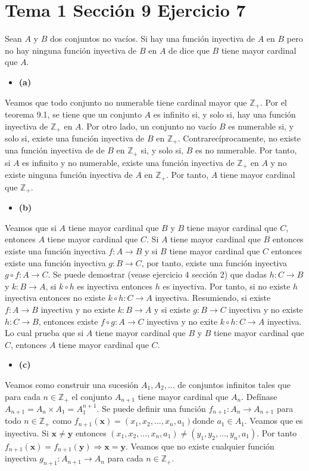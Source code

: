 \documentclass{article}
\newcommand{\vect}[1]{\boldsymbol{#1}}
\begin{document}
\section{Tema 1 Sección 9 Ejercicio 7}
Sean $A$ y $B$ dos conjuntos no vacíos. Si hay una función inyectiva de $A$ en $B$ pero no hay ninguna función inyectiva de $B$ en $A$ de dice que $B$ tiene mayor cardinal que $A$.
\begin{itemize}
\item \bf (a) \rm
\end{itemize}
Veamos que todo conjunto no numerable tiene cardinal mayor que $\mathbb{Z}_{+}$. Por el teorema 9.1, se tiene que un conjunto $A$ es infinito si, y solo si, hay una función inyectiva de $\mathbb{Z}_{+}$ en $A$. Por otro lado, un conjunto no vacío $B$ es numerable si, y solo si, existe una función inyectiva de $B$ en $\mathbb{Z}_{+}$. Contrarecíprocamente, no existe una función inyectiva de de $B$ en $\mathbb{Z}_{+}$ si, y solo si, $B$ es no numerable. Por tanto, si $A$ es infinito y no numerable, existe una función inyectiva de $\mathbb{Z}_{+}$ en $A$ y no existe ninguna función inyectiva de $A$ en $\mathbb{Z}_{+}$. Por tanto, $A$ tiene mayor cardinal que $\mathbb{Z}_{+}$.
\begin{itemize}
\item \bf (b) \rm
\end{itemize}
Veamos que si $A$ tiene mayor cardinal que $B$ y $B$ tiene mayor cardinal que $C$, entonces $A$ tiene mayor cardinal que $C$. 
Si $A$ tiene mayor cardinal que $B$ entonces existe una función inyectiva $f:A\rightarrow B$ y si  $B$ tiene mayor cardinal que $C$ entonces existe una función inyectiva $g:B\rightarrow C$, por tanto, existe una función inyectiva $g\circ f: A\rightarrow C$. Se puede demostrar (vease ejercicio 4 sección 2) que dadas  $h:C\rightarrow B$ y $k:B \rightarrow A$, si $k\circ h$ es inyectiva entonces $h$ es inyectiva. Por tanto, si no existe $h$ inyectiva entonces no existe $k\circ h:C \rightarrow A$ inyectiva. Resumiendo, si existe $f:A\rightarrow B$ inyectiva y no existe $k:B\rightarrow A$ y si existe $g:B\rightarrow C$ inyectiva y no existe $h:C\rightarrow B$, entonces existe $f\circ g: A\rightarrow C$ inyectiva y no exite $k\circ h: C\rightarrow A$ inyectiva. Lo cual prueba que si $A$ tiene mayor cardinal que $B$ y $B$ tiene mayor cardinal que $C$, entonces $A$ tiene mayor cardinal que $C$. 
\begin{itemize}
\item \bf (c) \rm
\end{itemize}
Veamos como construir una sucesión $A_1, A_2, ...$ de conjuntos infinitos tales que para cada $n\in \mathbb{Z}_{+}$ el conjunto $A_{n+1}$ tiene mayor cardinal que $A_n$. Defínase $A_{n+1}=A_{n}\times A_1=A_1^{n+1}$. Se puede definir una función $f_{n+1}:A_n\rightarrow A_{n+1}$ para todo $n\in \mathbb{Z}_{+}$ como $f_{n+1}(\vect{x})=(x_1,x_2,...,x_n,a_1)$donde $a_1\in A_1$. Veamos que es inyectiva. Si $\vect{x}\neq \vect{y}$ entonces $(x_1,x_2,...,x_n,a_1)\neq (y_1,y_2,...,y_n,a_1)$. Por tanto $f_{n+1}(\vect{x})=f_{n+1}(\vect{y})\Rightarrow \vect{x}= \vect{y}$. Veamos que no existe cualquier función inyectiva  $g_{n+1}:A_{n+1}\rightarrow A_n$ para cada $n \in \mathbb{Z}_{+}$.
\end{document}
